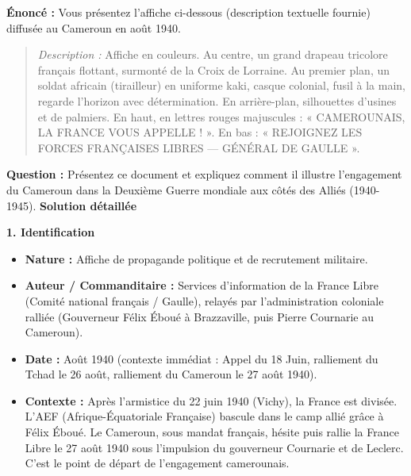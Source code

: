 \documentclass[11pt]{article}
\newcommand{\cle}[1]{{\popxbold\color{popdark}#1}}
\begin{document}
\begin{exoresolu}
\textbf{Énoncé :} Vous présentez l'affiche ci-dessous (description textuelle fournie) diffusée au Cameroun en août 1940.
\begin{quote}
\textit{Description :} Affiche en couleurs. Au centre, un grand drapeau tricolore français flottant, surmonté de la Croix de Lorraine. Au premier plan, un soldat africain (tirailleur) en uniforme kaki, casque colonial, fusil à la main, regarde l'horizon avec détermination. En arrière-plan, silhouettes d'usines et de palmiers. En haut, en lettres rouges majuscules : « CAMEROUNAIS, LA FRANCE VOUS APPELLE ! ». En bas : « REJOIGNEZ LES FORCES FRANÇAISES LIBRES — GÉNÉRAL DE GAULLE ».
\end{quote}
\textbf{Question :} Présentez ce document et expliquez comment il illustre l'engagement du Cameroun dans la Deuxième Guerre mondiale aux côtés des Alliés (1940-1945).
\tcblower
\textbf{Solution détaillée}

\textbf{1. Identification}
\begin{itemize}
    \item \textbf{Nature :} Affiche de propagande politique et de recrutement militaire.
    \item \textbf{Auteur / Commanditaire :} Services d'information de la \cle{France Libre} (Comité national français / Gaulle), relayés par l'administration coloniale ralliée (Gouverneur Félix Éboué à Brazzaville, puis Pierre Cournarie au Cameroun).
    \item \textbf{Date :} Août 1940 (contexte immédiat : \cle{Appel du 18 Juin}, ralliement du Tchad le 26 août, ralliement du Cameroun le 27 août 1940).
    \item \textbf{Contexte :} Après l'armistice du 22 juin 1940 (Vichy), la France est divisée. L'AEF (Afrique-Équatoriale Française) bascule dans le camp allié grâce à Félix Éboué. Le Cameroun, sous mandat français, hésite puis rallie la France Libre le 27 août 1940 sous l'impulsion du gouverneur Cournarie et de Leclerc. C'est le point de départ de l'engagement camerounais.
\end{itemize}


\end{exoresolu}
\end{document}
